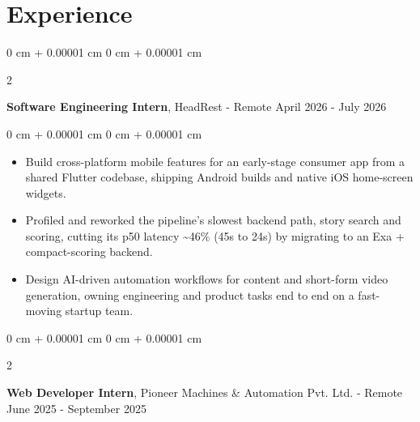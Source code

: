 \documentclass[10pt, letterpaper]{article}
\newenvironment{highlights}{
    \begin{itemize}[
        topsep=0.10 cm,
        parsep=0.10 cm,
        partopsep=0pt,
        itemsep=0pt,
        leftmargin=0 cm + 10pt
    ]
}{
    \end{itemize}
} %
\newenvironment{onecolentry}{
    \begin{adjustwidth}{
        0 cm + 0.00001 cm
    }{
        0 cm + 0.00001 cm
    }
}{
    \end{adjustwidth}
} %
\newenvironment{twocolentry}[2][]{
    \onecolentry
    \def\secondColumn{#2}
    \setcolumnwidth{\fill, 4.5 cm}
    \begin{paracol}{2}
}{
    \switchcolumn \raggedleft \secondColumn
    \end{paracol}
    \endonecolentry
} %
\begin{document}




    
    \section{Experience}

         \begin{twocolentry}{
            April 2026 - July 2026
        }
            \textbf{Software Engineering Intern}, HeadRest - Remote\end{twocolentry}

        \vspace{0.10 cm}
        \begin{onecolentry}
            \begin{highlights}
                \item Build cross-platform mobile features for an early-stage consumer app from a shared Flutter codebase, shipping Android builds and native iOS home-screen widgets.
                \item Profiled and reworked the pipeline's slowest backend path, story search and scoring, cutting its p50 latency \textasciitilde46\% (45s to 24s) by migrating to an Exa + compact-scoring backend.
                \item Design AI-driven automation workflows for content and short-form video generation, owning engineering and product tasks end to end on a fast-moving startup team.
            \end{highlights}
        \end{onecolentry}

        \vspace{0.2 cm}

         \begin{twocolentry}{
            June 2025 - September 2025
        }
            \textbf{Web Developer Intern}, Pioneer Machines \& Automation Pvt. Ltd. - Remote\end{twocolentry}
\end{document}

